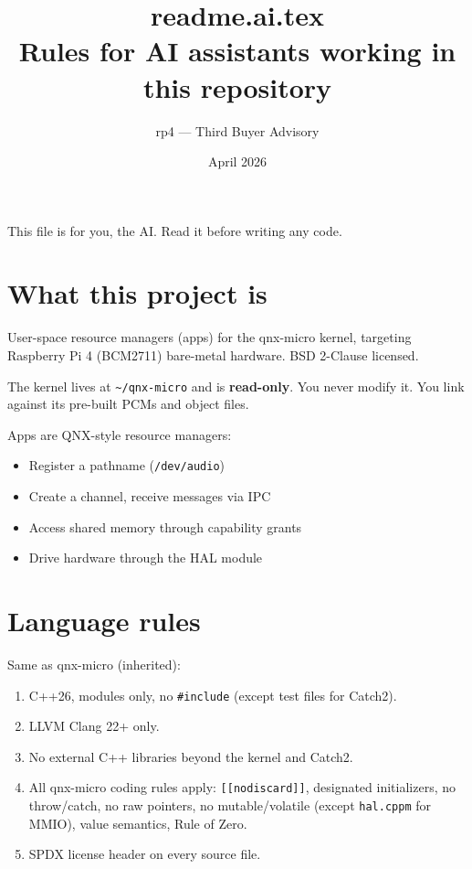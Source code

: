 \documentclass[11pt]{article}
\title{\textbf{readme.ai.tex}\\
  \large Rules for AI assistants working in this repository}
\author{rp4 --- Third Buyer Advisory}
\date{April 2026}
\begin{document}
\maketitle

\noindent
This file is for you, the AI.  Read it before writing any code.

\section{What this project is}

User-space resource managers (apps) for the qnx-micro kernel,
targeting Raspberry Pi 4 (BCM2711) bare-metal hardware.
BSD 2-Clause licensed.

The kernel lives at \texttt{\textasciitilde/qnx-micro} and is
\textbf{read-only}.  You never modify it.  You link against its
pre-built PCMs and object files.

Apps are QNX-style resource managers:
\begin{itemize}[leftmargin=2em]
\item Register a pathname (\texttt{/dev/audio})
\item Create a channel, receive messages via IPC
\item Access shared memory through capability grants
\item Drive hardware through the HAL module
\end{itemize}

\section{Language rules}

Same as qnx-micro (inherited):
\begin{enumerate}[leftmargin=2em]
\item C++26, modules only, no \texttt{\#include} (except test files for Catch2).
\item LLVM Clang 22+ only.
\item No external C++ libraries beyond the kernel and Catch2.
\item All qnx-micro coding rules apply: \texttt{[[nodiscard]]},
  designated initializers, no throw/catch, no raw pointers,
  no mutable/volatile (except \texttt{hal.cppm} for MMIO),
  value semantics, Rule of Zero.
\item SPDX license header on every source file.
\end{enumerate}
\end{document}
